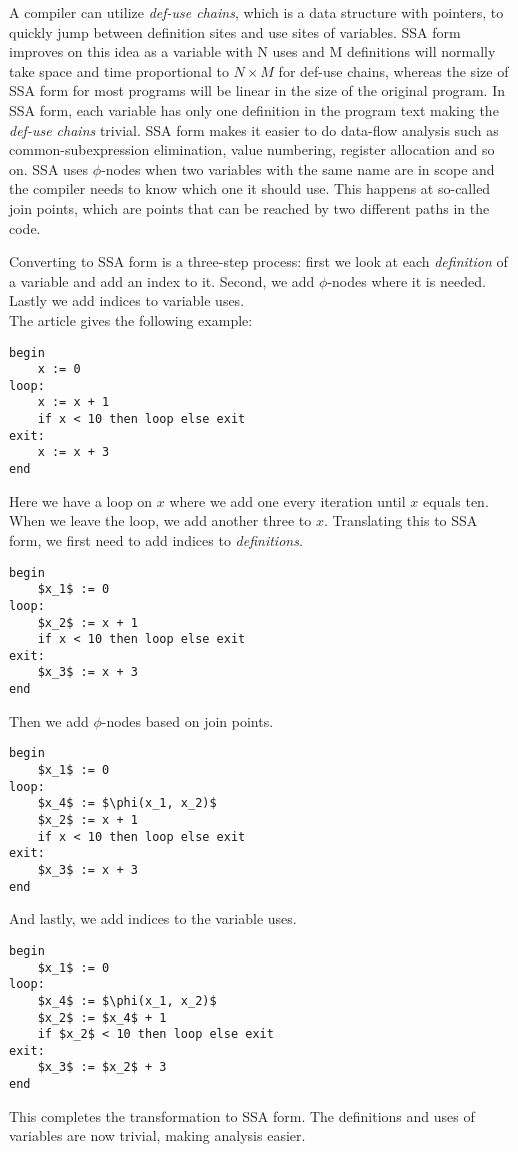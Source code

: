 A compiler can utilize \emph{def-use chains}, which is a data structure with pointers, to quickly jump between definition sites and use sites of variables.
SSA form improves on this idea as a variable with N uses and M definitions will normally take space and time proportional to $N \times M$ for def-use chains, whereas the size of SSA form for most programs will be linear in the size of the original program.
In SSA form, each variable has only one definition in the program text making the \emph{def-use chains} trivial.
SSA form makes it easier to do data-flow analysis such as common-subexpression elimination, value numbering, register allocation and so on.
SSA uses $\phi$-nodes when two variables with the same name are in scope and the compiler needs to know which one it should use.
This happens at so-called join points, which are points that can be reached by two different paths in the code.

Converting to SSA form is a three-step process: first we look at each \emph{definition} of a variable and add an index to it.
Second, we add $\phi$-nodes where it is needed.
Lastly we add indices to variable uses. \\
The article \cite{10.1007/978-3-319-41579-6_16} gives the following example:
\begin{lstlisting}
begin
    x := 0
loop:
    x := x + 1
    if x < 10 then loop else exit
exit:
    x := x + 3
end
\end{lstlisting}
Here we have a loop on $x$ where we add one every iteration until $x$ equals ten.
When we leave the loop, we add another three to $x$.
Translating this to SSA form, we first need to add indices to \emph{definitions}.
\begin{lstlisting}[mathescape=true]
begin
    $x_1$ := 0
loop:
    $x_2$ := x + 1
    if x < 10 then loop else exit
exit:
    $x_3$ := x + 3
end
\end{lstlisting}
Then we add $\phi$-nodes based on join points.
\begin{lstlisting}[mathescape=true]
begin
    $x_1$ := 0
loop:
    $x_4$ := $\phi(x_1, x_2)$
    $x_2$ := x + 1
    if x < 10 then loop else exit
exit:
    $x_3$ := x + 3
end
\end{lstlisting}
And lastly, we add indices to the variable uses.
\begin{lstlisting}[mathescape=true]
begin
    $x_1$ := 0
loop:
    $x_4$ := $\phi(x_1, x_2)$
    $x_2$ := $x_4$ + 1
    if $x_2$ < 10 then loop else exit
exit:
    $x_3$ := $x_2$ + 3
end
\end{lstlisting}
This completes the transformation to SSA form. The definitions and uses of variables are now trivial, making analysis easier.

